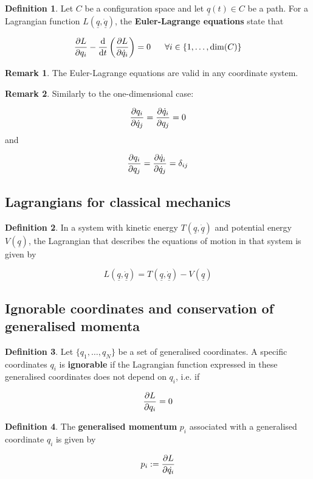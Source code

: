 \documentclass[12pt,a4paper]{article}
\theoremstyle{definition}
\newtheorem{definition}{Definition}[subsection]
\newtheorem*{remark}{Remark}
\let\oldforall\forall
\renewcommand{\forall}{\ \oldforall}
\begin{document}
\begin{definition}
	Let $C$ be a configuration space and let $\underline{q}(t) \in C$ be a path. For a Lagrangian function $L(\underline{q}, \underline{\dot{q}})$, the \textbf{Euler-Lagrange equations} state that

	\[ \diffp{L}{q_i} - \diff{}{t} \left( \diffp{L}{\dot{q}_i} \right) = 0 \quad \forall i \in \{ 1, \dots, \dim(C) \} \]
\end{definition}

\begin{remark}
	The Euler-Lagrange equations are valid in any coordinate system.
\end{remark}

\begin{remark}
	Similarly to the one-dimensional case:

	\[ \diffp{q_i}{\dot{q}_j} = \diffp{\dot{q}_i}{q_j} = 0 \]
	and

	\[ \diffp{q_i}{q_j} = \diffp{\dot{q}_i}{\dot{q}_j} = \delta_{ij} \]
\end{remark}

\subsection{Lagrangians for classical mechanics}

\begin{definition}
	In a system with kinetic energy $T(\underline{q}, \underline{\dot{q}})$ and potential energy $V(\underline{q})$, the Lagrangian that describes the equations of motion in that system is given by

	\[ L(\underline{q}, \underline{\dot{q}}) = T(\underline{q}, \underline{\dot{q}}) - V(\underline{q}) \]
\end{definition}

\subsection{Ignorable coordinates and conservation of generalised momenta}

\begin{definition}
	Let $\{ q_1, \dots, q_N \}$ be a set of generalised coordinates. A specific coordinates $q_i$ is \textbf{ignorable} if the Lagrangian function expressed in these generalised coordinates does not depend on $q_i$, i.e. if

	\[ \diffp{L}{q_i} = 0 \]
\end{definition}

\begin{definition}
	The \textbf{generalised momentum} $p_i$ associated with a generalised coordinate $q_i$ is given by

	\[ p_i := \diffp{L}{\dot{q_i}} \]
\end{definition}
\end{document}
